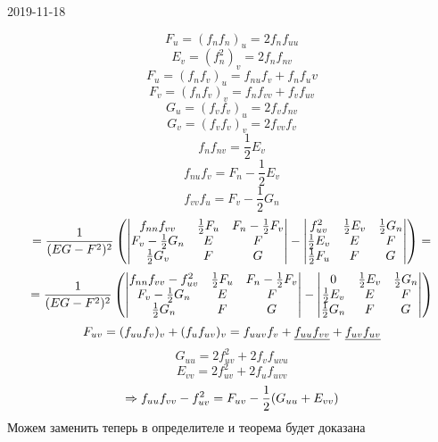 \documentclass[main]{subfiles}
\begin{document}
\begin{lect}{2019-11-18}
\begin{Proof}[теоремы]
          \[F_u = (f_n f_n)_u = 2 f_n f_{uu}\]
          \[E_v = (f_n^2)_v = 2 f_n f_{nv}\]
          \[F_u = (f_n f_v)_u = f_{nu}f_v + f_n f_uv\]
          \[F_v = (f_n f_v)_v = f_n f_{vv} + f_v f_{uv}\]
          \[G_u = (f_v f_v)_u = 2 f_v f_{nv}\]
          \[G_v = (f_v f_v)_v = 2 f_{vv} f_v\]
          \[f_n f_{nv} = \frac{1}{2} E_v\]
          \[f_{nu} f_v = F_n - \frac{1}{2} E_v\]
          \[f_{vv} f_u = F_v - \frac{1}{2} G_n\]
          \[ = \frac{1}{(EG - F^2)^2} \left(\begin{vmatrix}
              f_{nn} f_{vv} & \frac{1}{2} F_u & F_n - \frac{1}{2} F_v\\
              F_v - \frac{1}{2} G_n & E & F\\
              \frac{1}{2} G_v & F & G
            \end{vmatrix} - \begin{vmatrix}
                f_{uv}^2 & \frac{1}{2}E_v & \frac{1}{2} G_n\\
                \frac{1}{2}E_v & E & F\\
                \frac{1}{2}F_u & F & G
              \end{vmatrix}\right) =
          \]
          \[ = \frac{1}{(EG - F^2)^2} \left(\begin{vmatrix}
              f_{nn} f_{vv} - f_{uv}^2 & \frac{1}{2} F_u & F_n - \frac{1}{2} F_v\\
              F_v - \frac{1}{2} G_n & E & F\\
              \frac{1}{2} G_n & F & G
            \end{vmatrix} - \begin{vmatrix}
              0 & \frac{1}{2}E_v & \frac{1}{2} G_n\\
              \frac{1}{2}E_v & E & F\\
              \frac{1}{2}G_n & F & G
            \end{vmatrix}\right)
          \]
          \[F_{uv} = (f_{uu} f_v)_v + (f_u f_{uv})_v = f_{uuv} f_v + \underline{f_{uu}f_{vv}} + \underline{f_{uv}f_{uv}}\]
          \[G_{uu} = 2 f_{uv}^2 + 2 f_v f_{uvu}\]
          \[E_{vv} = 2 f_{uv}^2 + 2 f_u f_{uvv}\]
          \[\Rightarrow f_{uu} f_{vv} - f^2_{uv} = F_{uv} - \frac{1}{2}(G_{uu}+E_{vv})\]
          Можем заменить теперь в определителе и теорема будет доказана
      \end{Proof}


\end{lect}
\end{document}
